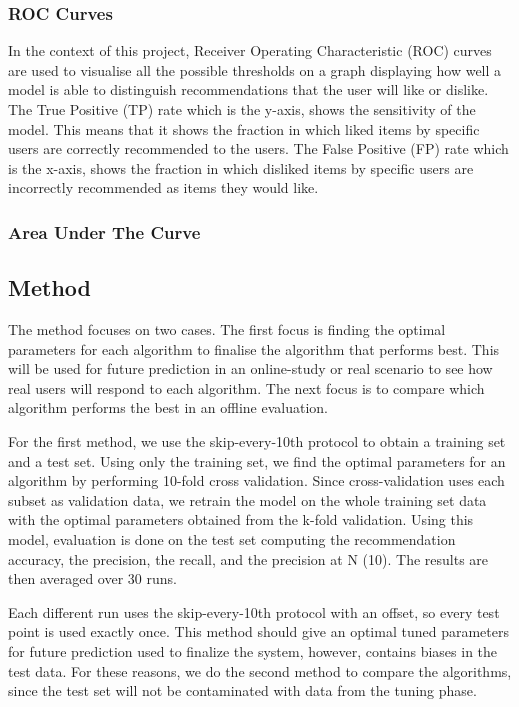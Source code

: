 \subsubsection{ROC Curves}
In the context of this project, Receiver Operating Characteristic (ROC) curves  are used to visualise all the possible thresholds on a graph displaying how well a model is able to distinguish recommendations that the user will like or dislike. The True Positive (TP) rate which is the y-axis, shows the sensitivity of the model. This means that it shows the fraction in which liked items by specific users are correctly recommended to the users. The False Positive (FP) rate which is the x-axis, shows the fraction in which disliked items by specific users are incorrectly recommended as items they would like. 

\subsubsection{Area Under The Curve}


\subsection{Method} \label{Method}


The method focuses on two cases. The first focus is finding the optimal parameters for each algorithm to finalise the algorithm that performs best. This will be used for future prediction in an online-study or real scenario to see how real users will respond to each algorithm. The next focus is to compare which algorithm performs the best in an offline evaluation.

For the first method, we use the skip-every-10th protocol to obtain a training set and a test set. Using only the training set, we find the optimal parameters for an algorithm by performing 10-fold cross validation. Since cross-validation uses each subset as validation data, we retrain the model on the whole training set data with the optimal parameters obtained from the k-fold validation. Using this model, evaluation is done on the test set computing the recommendation accuracy, the precision, the recall, and the precision at N (10). The results are then averaged over 30 runs. 

 Each different run uses the skip-every-10th protocol with an offset, so every test point is used exactly once. This method should give an optimal tuned parameters for future prediction used to finalize the system, however, contains biases in the test data. For these reasons, we do the second method to compare the algorithms, since the test set will not be contaminated with data from the tuning phase.


